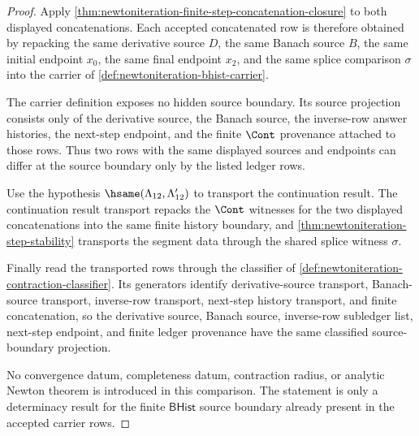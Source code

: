 \begin{proof}
Apply \autoref{thm:newtoniteration-finite-step-concatenation-closure} to both displayed concatenations. Each accepted concatenated row is therefore obtained by repacking the same derivative source $D$, the same Banach source $B$, the same initial endpoint $x_0$, the same final endpoint $x_2$, and the same splice comparison $\sigma$ into the carrier of \autoref{def:newtoniteration-bhist-carrier}.

The carrier definition exposes no hidden source boundary. Its source projection consists only of the derivative source, the Banach source, the inverse-row answer histories, the next-step endpoint, and the finite $\Cont$ provenance attached to those rows. Thus two rows with the same displayed sources and endpoints can differ at the source boundary only by the listed ledger rows.

Use the hypothesis $\hsame(\Lambda_{12},\Lambda'_{12})$ to transport the continuation result. The continuation result transport repacks the $\Cont$ witnesses for the two displayed concatenations into the same finite history boundary, and \autoref{thm:newtoniteration-step-stability} transports the segment data through the shared splice witness $\sigma$.

Finally read the transported rows through the classifier of \autoref{def:newtoniteration-contraction-classifier}. Its generators identify derivative-source transport, Banach-source transport, inverse-row transport, next-step history transport, and finite concatenation, so the derivative source, Banach source, inverse-row subledger list, next-step endpoint, and finite ledger provenance have the same classified source-boundary projection.

No convergence datum, completeness datum, contraction radius, or analytic Newton theorem is introduced in this comparison. The statement is only a determinacy result for the finite $\mathsf{BHist}$ source boundary already present in the accepted carrier rows.
\end{proof}

